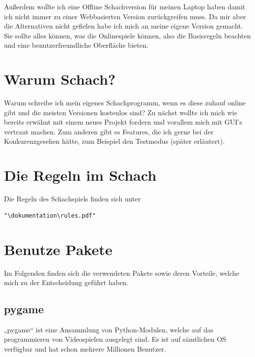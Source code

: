 \documentclass[a4paper, 10pt]{scrartcl}
\begin{document}
Außerdem wollte ich eine Offline Schachversion für meinen Laptop haben
damit ich nicht immer zu einer Webbasierten Version zurückgreifen muss. Da mir aber die
Alternativen nicht gefielen habe ich mich an meine eigene Version gemacht. Sie sollte
alles können, was die Onlinespiele können, also die Basisregeln beachten und eine benutzerfreundliche
Oberfläche bieten. 

\section{Warum Schach?}
Warum schreibe ich mein eigenes Schachprogramm, wenn es diese zuhauf online gibt und die meisten Versionen kostenlos sind?
Zu nächst wollte ich mich wie bereits erwähnt mit einem neues Projekt fordern und vorallem mich mit GUI's vertraut machen.
Zum anderen gibt es Features, die ich gerne bei der \glqq Konkurenz\grqq gesehen hätte, zum Beispiel den Testmodus (später erläutert).

\section{Die Regeln im Schach}
Die Regeln des Schachspiels finden sich unter \begin{verbatim}"\dokumentation\rules.pdf" \end{verbatim}

\section{Benutze Pakete}
Im Folgenden finden sich die verwendeten Pakete sowie deren Vorteile, welche mich zu der Entscheidung geführt haben.

\subsection{pygame}
„pygame“ ist eine Ansammlung von Python-Modulen, welche auf das programmieren von Videospielen ausgelegt sind. Es ist auf sämtlichen OS verfügbar und hat schon mehrere Millionen Benutzer.
\end{document}
